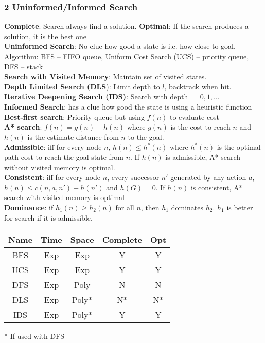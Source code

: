 \documentclass{article}
\begin{document}
{\begin{multicols*}{3}
\subsubsection*{\underline{2 Uninformed/Informed Search}}
\textbf{Complete}: Search always find a solution. \textbf{Optimal}: If the search produces a solution, it is the best one\\
\textbf{Uninformed Search}: No clue how good a state is i.e. how close to goal. Algorithm: BFS – FIFO queue, Uniform Cost Search (UCS) – priority queue, DFS – stack\\
\textbf{Search with Visited Memory}: Maintain set of visited states.\\
\textbf{Depth Limited Search (DLS}): Limit depth to $l$, backtrack when hit.\\
\textbf{Iterative Deepening Search (IDS)}: Search with depth $=0,1,\dots$\\
\textbf{Informed Search}: has a clue how good the state is using a heuristic function\\
\textbf{Best-first search}: Priority queue but using $f(n)$ to evaluate cost\\
\textbf{A* search}: $f(n)=g(n)+h(n)$ where $g(n)$ is the cost to reach $n$ and $h(n)$ is the estimate distance from $n$ to the goal.\\
\textbf{Admissible}: iff for every node $n$, $h(n) \leq h^*(n)$ where $h^*(n)$ is the optimal path cost to reach the goal state from $n$. If $h(n)$ is admissible, A* search without visited memory is optimal.\\
\textbf{Consistent}: iff for every node $n$, every successor $n'$ generated by any action $a$, $h(n)\leq c(n,a,n')+h(n')$ and $h(G)=0$. If $h(n)$ is consistent, A* search with visited memory is optimal\\
\textbf{Dominance}: if $h_1(n)\geq h_2(n)$ for all $n$, then $h_1$ dominates $h_2$. $h_1$ is better for search if it is admissible.
\begin{center}
\vspace{-0.2cm}
\hspace*{-\leftskip}
    \begin{tabular}{|c|c|c|c|c|}
    \hline
    Name & Time & Space & Complete & Opt \\ \hline
    BFS & Exp & Exp & Y & Y \\  \hline
    UCS & Exp & Exp & Y & Y \\ \hline
    DFS & Exp & Poly & N & N \\ \hline
    DLS & Exp & Poly* & N* & N* \\ \hline
    IDS & Exp & Poly* & Y & Y \\
    \hline
    \end{tabular}
\end{center}
\vspace{-0.2cm}* If used with DFS

\end{multicols*}}
\end{document}
